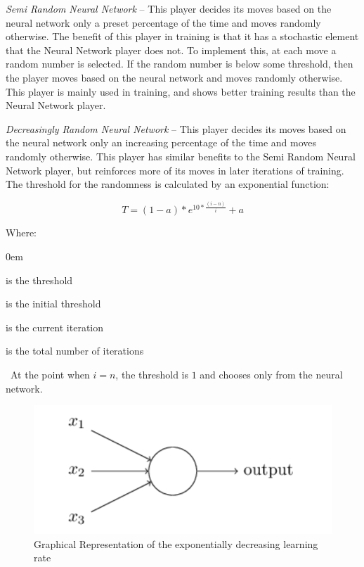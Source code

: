 \documentclass{sig-alternate-05-2015}
\begin{document}
\emph{Semi Random Neural Network} -- This player decides its moves based on the neural network only a preset percentage of the time and moves randomly otherwise. The benefit of this player in training is that it has a stochastic element that the Neural Network player does not. To implement this, at each move a random number is selected. If the random number is below some threshold, then the player moves based on the neural network and moves randomly otherwise. This player is mainly used in training, and shows better training results than the Neural Network player.

\emph{Decreasingly Random Neural Network} -- This player decides its moves based on the neural network only an increasing percentage of the time and moves randomly otherwise. This player has similar benefits to the Semi Random Neural Network player, but reinforces more of its moves in later iterations of training. The threshold for the randomness is calculated by an exponential function:

\begin{equation}
T = (1-a) * e^{10 * \frac{(i-n)}{i} }+ a
\end{equation}

Where:
\begin{description}
\itemsep0em 
\item [t] is the threshold 
\item [a] is the initial threshold
\item [i] is the current iteration
\item [n] is the total number of iterations
\end{description} 
\
At the point when $i = n$, the threshold is $1$ and chooses only from the neural network.

\begin{figure}[h!]
  \includegraphics[width=\linewidth]{neuron.png}
  \caption{Graphical Representation of the exponentially decreasing learning rate}
  \label{fig:neuron4}
\end{figure}
\end{document}
